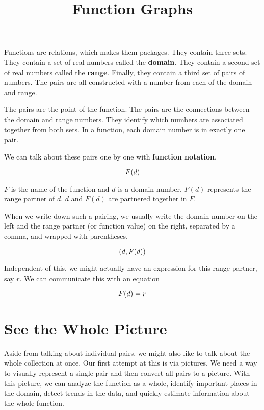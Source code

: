 \documentclass{ximera}
\title{Function Graphs}
\begin{document}
\begin{abstract}

\end{abstract}
\maketitle


Functions are relations, which makes them packages.  They contain three sets.  They contain a set of real numbers called the \textbf{domain}.  They contain a second set of real numbers called the \textbf{range}. Finally, they contain a third set of pairs of numbers.  The pairs are all constructed with a number from each of the domain and range.

The pairs are the point of the function.  The pairs are the connections between the domain and range numbers.  They identify which numbers are associated together from both sets. In a function, each domain number is in exactly one pair.

We can talk about these pairs one by one with \textbf{function notation}.

\[
\large{F(d)}
\]


$F$ is the name of the function and $d$ is a domain number.  $F(d)$ represents the range partner of $d$.  $d$ and $F(d)$ are partnered together in $F$.

When we write down such a pairing, we usually write  the domain number on the left and the range partner (or function value) on the right, separated by a comma, and wrapped with parentheses.

\[ 
\large{(d, F(d))} 
\]

Independent of this, we might actually have an expression for this range partner, say $r$.  We can communicate this with an equation


\[
\large{F(d) = r}
\]


\section{See the Whole Picture}

Aside from talking about individual pairs, we might also like to talk about the whole collection at once.  Our first attempt at this is via pictures. We need a way to visually represent a single pair and then convert all pairs to a picture.  With this picture, we can analyze the function as a whole, identify important places in the domain, detect trends in the data, and quickly estimate information about the whole function.
\end{document}
